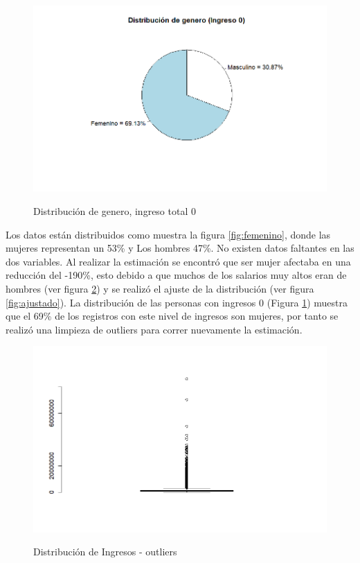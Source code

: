 \documentclass[11pt,a4paper]{article}
\begin{document}
\begin{figure}[H]
    \centering
    \caption{Distribución de genero, ingreso total 0}
    \includegraphics[width=\textwidth]{../views/ingreso_0.png}
    \label{fig:ingreso_0}
\end{figure}

Los datos están distribuidos como muestra la figura \ref{fig:femenino}, donde las mujeres representan un 53\% y Los hombres 47\%. No existen datos faltantes en las dos variables. Al realizar la estimación se encontró que ser mujer afectaba en una reducción del -190\%, esto debido a que muchos de los salarios muy altos eran de hombres (ver figura \ref{fig:outl}) y se realizó el ajuste de la distribución (ver figura \ref{fig:ajustado}). La distribución de las personas con ingresos 0 (Figura \ref{fig:ingreso_0}) muestra que el 69\% de los registros con este nivel de ingresos son mujeres, por tanto se realizó una limpieza de outliers para correr nuevamente la estimación.\\

\begin{figure}[H]
    \centering
    \caption{Distribución de Ingresos - outliers}
    \includegraphics[width=\textwidth]{../views/outliers.png}
    \label{fig:outl}
\end{figure}
\end{document}
